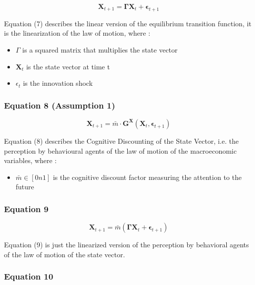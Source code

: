 \documentclass{article}
\begin{document}
\begin{equation}
    \bm{X}_{t+1}=\bm{\Gamma}\bm{X}_{t}+\bm{\epsilon}_{t+1}
\end{equation}

Equation (7) describes the linear version of the equilibrium transition function, it is the linearization of the law of motion, where :
\begin{itemize}
    \item $\Gamma$ is a squared matrix that multiplies the state vector
    \item $\bm{X}_t$ is the state vector at time t
    \item $\epsilon_{t}$ is the innovation shock
\end{itemize}

\subsubsection*{Equation 8 (Assumption 1)}

\begin{equation}
    \bm{X}_{t+1}=\bar{m}\cdot\bm{G}^{\bm{X}}(\bm{X}_{t},\bm{\epsilon}_{t+1})
\end{equation}

Equation (8) describes the Cognitive Discounting of the State Vector, i.e. the perception by behavioural agents of the law of motion of the macroeconomic variables, where : 
\begin{itemize}
    \item $\bar{m}\in\left[0n1\right]$ is the cognitive discount factor measuring the attention to the future
\end{itemize}

\subsubsection*{Equation 9}

\begin{equation}
    \bm{X}_{t+1}=\bar{m}(\bm{\Gamma}\bm{X}_{t}+\bm{\epsilon}_{t+1})
\end{equation}

Equation (9) is just the linearized version of the perception by behavioral agents of the law of motion of the state vector. 

\subsubsection*{Equation 10}
\end{document}
